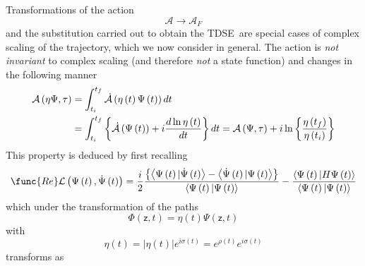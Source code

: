 \documentclass[aps,preprint]{revtex4}
\begin{document}
Transformations of the action 
\begin{equation}
\mathcal{A\longrightarrow A}_{F}
\end{equation}
and the substitution carried out to obtain the TDSE\ are special cases of
complex scaling of the trajectory, which we now consider in general. The
action is \emph{not invariant }to complex scaling (and therefore \emph{not}
a state function) and changes in the following manner%
\begin{align}
\mathcal{A}\left( \eta\Psi,\tau\right) & =\int_{t_{i}}^{t_{f}}\mathcal{\dot{A%
}}\left( \eta\left( t\right) \Psi\left( t\right) \right) dt  \notag \\
& =\int_{t_{i}}^{t_{f}}\left\{ \mathcal{\dot{A}}\left( \Psi\left( t\right)
\right) +i\frac{d\ln\eta\left( t\right) }{dt}\right\} dt=\mathcal{A}\left(
\Psi,\tau\right) +i\ln\left\{ \frac{\eta\left( t_{f}\right) }{\eta\left(
t_{i}\right) }\right\}
\end{align}
This property is deduced by first recalling 
\begin{equation}
\func{Re}\mathcal{L}\left( \Psi\left( t\right) ,\dot{\Psi}\left( t\right)
\right) =\frac{i}{2}\frac{\left\{ \left\langle \Psi\left( t\right) |\dot{\Psi%
}\left( t\right) \right\rangle -\left\langle \dot{\Psi }\left( t\right)
|\Psi\left( t\right) \right\rangle \right\} }{\left\langle \Psi\left(
t\right) |\Psi\left( t\right) \right\rangle }-\frac{\left\langle \Psi\left(
t\right) |H\Psi\left( t\right) \right\rangle }{\left\langle \Psi\left(
t\right) |\Psi\left( t\right) \right\rangle }
\end{equation}
which under the transformation of the paths 
\begin{equation}
\Phi\left( \mathsf{z,}t\right) =\eta\left( t\right) \Psi\left( \mathsf{z,}%
t\right)
\end{equation}
with 
\begin{equation}
\eta\left( t\right) =\left| \eta\left( t\right) \right| e^{i\sigma \left(
t\right) }=e^{\rho\left( t\right) }e^{i\sigma\left( t\right) }
\end{equation}
transforms as 
\end{document}
